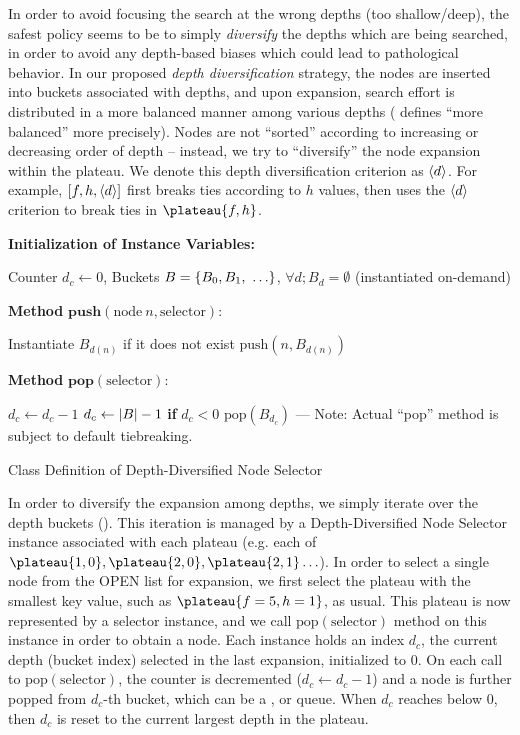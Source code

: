 In order to avoid focusing the search at the wrong depths (too shallow/deep), 
the safest policy seems to be to simply \emph{diversify} the depths which are being searched,
in order to avoid any depth-based biases which could lead to pathological behavior.
In our proposed \emph{depth diversification} strategy, the nodes are inserted into buckets
associated with depths, and upon expansion, search effort is distributed in a more balanced manner
among various depths ( defines ``more balanced''  more precisely).
Nodes are not  ``sorted''
according to increasing or decreasing order of depth -- instead, we try to 
``diversify'' the node expansion within the plateau.
We denote this depth diversification criterion as ${\left<d\right>}$. 
For example, $[f,h,{\left<d\right>}]$ first breaks ties according to $h$ values,
then uses the ${\left<d\right>}$ criterion to break ties in $\plateau{f,h}$.

\begin{algorithm}
 \textbf{Initialization of Instance Variables:}
\begin{algorithmic}
 \STATE Counter $d_c\leftarrow 0$, Buckets $B={\left\{B_0, B_1,\ \ldots\right\}}$, $\forall d; B_d=\emptyset$ (instantiated on-demand)
\end{algorithmic}
 \textbf{Method} $\textbf{push}(\text{node}\ n,\text{selector})$:
\begin{algorithmic}
 \STATE Instantiate $B_{d(n)}$ if it does not exist
 \STATE $\text{push}(n, B_{d(n)})$
\end{algorithmic}
 \textbf{Method} $\textbf{pop}(\text{selector})$:
\begin{algorithmic}[1]
 \LOOP
 \STATE $d_c\leftarrow d_c-1$
 \STATE $d_c\leftarrow {\left|B\right|}-1$ \textbf{if} $d_c<0$
 \RETURN $\text{pop}(B_{d_c})$ --- Note: Actual ``pop'' method is subject to default tiebreaking.
 \ENDIF
 \ENDLOOP
\end{algorithmic}
\caption{Class Definition of Depth-Diversified Node Selector}
\label{alg:depth}
\end{algorithm}

In order to diversify the expansion among depths, we simply
iterate over the depth buckets ().
This iteration is managed by a Depth-Diversified Node Selector instance associated with each plateau (e.g. each of $\plateau{1,0}, \plateau{2,0}, \plateau{2,1}\ldots$).
In order to select a single node from the OPEN list for expansion,
we first select the plateau with the smallest key value, such as $\plateau{f=5,h=1}$, as usual.
This plateau is now represented by a selector instance, and
we call $\text{pop}(\text{selector})$ method on this instance in order to obtain a node.
Each instance holds
an index $d_c$,
the current depth (bucket index) selected in the last expansion,
initialized to 0.
On each call to $\text{pop}(\text{selector})$,
the counter is decremented ($d_c\leftarrow d_c-1$) and
a node is further popped from $d_c$-th bucket, which can be a \lifo, \fifo or \ro queue.
When $d_c$ reaches below 0, then $d_c$
is reset to the current largest depth in the plateau.


